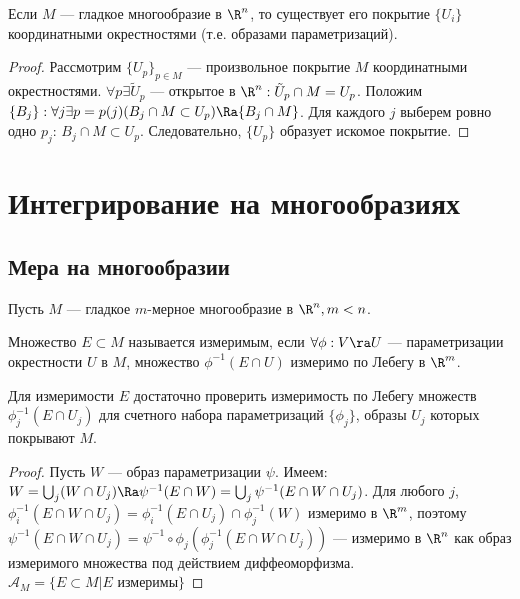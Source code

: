 \begin{lemma}
    Если \(M\) --- гладкое многообразие в \(\R^n\), то существует его покрытие \(\{U_i\}\) координатными окрестностями (т.е. образами параметризаций).
\end{lemma}
\begin{proof}
    Рассмотрим \(\{U_p\}_{p \in M}\) --- произвольное покрытие \(M\) координатными окрестностями. \(\forall p \exists \tilde{U}_p\) --- открытое в \(\R^n: \tilde{U}_p \cap M = U_p\). Положим \(\{B_j\}: \forall j \exists p = p(j) (B_j \cap M \subset U_p) \Ra \{B_j \cap M\}\). Для каждого \(j\) выберем ровно одно \(p_j\): \(B_j \cap M \subset U_p\). Следовательно, \(\{U_p\}\) образует искомое покрытие.
\end{proof}

\section{Интегрирование на многообразиях}
\subsection{Мера на многообразии}
Пусть \(M\) --- гладкое \(m\)-мерное многообразие в \(\R^n, m < n\).

\begin{definition}
    Множество \(E \subset M\) называется измеримым, если \(\forall \phi: V \ra U\) --- параметризации окрестности \(U\) в \(M\), множество \(\phi^{-1}(E \cap U)\) измеримо по Лебегу в \(\R^m\).
\end{definition}
\begin{note}
    Для измеримости \(E\) достаточно проверить измеримость по Лебегу множеств \(\phi_j^{-1}(E \cap U_j)\) для счетного набора параметризаций \(\{\phi_j\}\), образы \(U_j\) которых покрывают \(M\).
\end{note}
\begin{proof}
    Пусть \(W\) --- образ параметризации \(\psi\). Имеем: \(W = \bigcup_{j} (W \cap U_j) \Ra \psi^{-1}(E \cap W) = \bigcup_{j} \psi^{-1}(E \cap W \cap U_j)\). Для любого \(j\), \(\phi^{-1}_i(E \cap W \cap U_j) = \phi_i^{-1}(E \cap U_j) \cap \phi^{-1}_j(W)\) измеримо в \(\R^m\), поэтому \(\psi^{-1}(E \cap W \cap U_j) = \psi^{-1} \circ \phi_j(\phi_j^{-1}(E \cap W \cap U_j))\) --- измеримо в \(\R^n\) как образ измеримого множества под действием диффеоморфизма. \(\mathcal{A}_M = \{E \subset M | E\text{ измеримы}\}\)
\end{proof}

